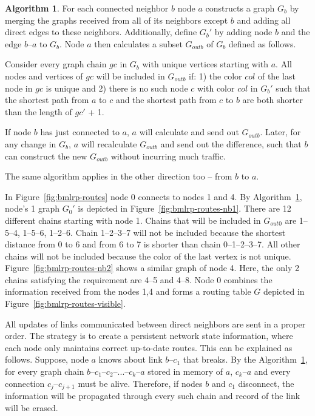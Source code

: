 \documentclass[14pt]{extarticle}
\theoremstyle{definition}
\newtheorem{algo}{Algorithm}
\begin{document}
\begin{samepage}
\begin{algo}
    For each connected neighbor $b$ node $a$ constructs a graph $G_b$ by merging the graphs received from all of its neighbors except $b$ and adding all direct edges to these neighbors. Additionally, define $G_b'$ by adding node $b$ and the edge $b$--$a$ to $G_b$. Node $a$ then calculates a subset $G_{outb}$ of $G_b$ defined as follows.

    Consider every graph chain $gc$ in $G_b$ with unique vertices starting with $a$. All nodes and vertices of $gc$ will be included in $G_{outb}$ if: 1) the color $col$ of the last node in $gc$ is unique and 2) there is no such node $c$ with color $col$ in $G_b'$ such that the shortest path from $a$ to $c$ and the shortest path from $c$ to $b$ are both shorter than the length of $gc'$ + 1.

    If node $b$ has just connected to $a$, $a$ will calculate and send out $G_{outb}$. Later, for any change in $G_b$, $a$ will recalculate $G_{outb}$ and send out the difference, such that $b$ can construct the new $G_{outb}$ without incurring much traffic.

    The same algorithm applies in the other direction too -- from $b$ to $a$.

    \label{alg:routes}
\end{algo}
\end{samepage}

In Figure~\ref{fig:bmlrp-routes} node 0 connects to nodes 1 and 4. By Algorithm~\ref{alg:routes}, node's 1 graph $G_0'$ is depicted in Figure~\ref{fig:bmlrp-routes-nb1}. There are 12 different chains starting with node 1. Chains that will be included in $G_{out0}$ are 1--5--4, 1--5--6, 1--2--6. Chain 1--2--3--7 will not be included because the shortest distance from 0 to 6 and from 6 to 7 is shorter than chain 0--1--2--3--7. All other chains will not be included because the color of the last vertex is not unique. Figure~\ref{fig:bmlrp-routes-nb2} shows a similar graph of node 4. Here, the only 2 chains satisfying the requirement are 4--5 and 4--8. Node 0 combines the information received from the nodes 1,4 and forms a routing table $G$ depicted in Figure~\ref{fig:bmlrp-routes-visible}.



All updates of links communicated between direct neighbors are sent in a proper order. The strategy is to create a persistent network state information, where each node only maintains correct up-to-date routes. This can be explained as follows. Suppose, node $a$ knows about link $b$--$c_1$ that breaks. By the Algorithm~\ref{alg:routes}, for every graph chain $b$--$c_1$--$c_2$--...--$c_k$--$a$ stored in memory of $a$, $c_k$--$a$ and every connection $c_j$--$c_{j+1}$ must be alive. Therefore, if nodes $b$ and $c_1$ disconnect, the information will be propagated through every such chain and record of the link will be erased.
\end{document}
